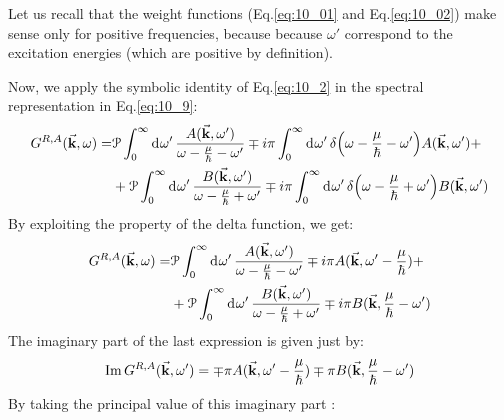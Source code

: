 \documentclass[../main/main.tex]{subfiles}
\begin{document}
\begin{remark}
Let us recall that the weight functions (Eq.\eqref{eq:10_01} and Eq.\eqref{eq:10_02}) make sense only for positive frequencies, because because \( \omega'  \) correspond to the excitation energies (which are positive by definition).
\end{remark}

Now, we apply the symbolic identity of Eq.\eqref{eq:10_2} in the spectral representation in Eq.\eqref{eq:10_9}:
\begin{equation*}
\begin{split}
G^{R,A} (\va{k}, \omega )  = &\mathcal{P} \int_{0}^{\infty } \dd[]{\omega'}
\frac{A(\va{k}, \omega')}{\omega - \frac{\mu }{\hbar } - \omega'}
\mp i \pi \int_{0}^{\infty } \dd[]{\omega'} \delta \qty( \omega - \frac{\mu }{\hbar } - \omega') A(\va{k}, \omega')   +   \\
& + \mathcal{P} \int_{0}^{\infty } \dd[]{\omega'}
\frac{B(\va{k}, \omega')}{\omega - \frac{\mu }{\hbar } + \omega'}
\mp i \pi \int_{0}^{\infty } \dd[]{\omega'} \delta \qty( \omega - \frac{\mu }{\hbar } + \omega') B(\va{k}, \omega')
\end{split}
\end{equation*}
By exploiting the property of the delta function, we get:
\begin{equation*}
\begin{split}
G^{R,A} (\va{k}, \omega )  = &\mathcal{P} \int_{0}^{\infty } \dd[]{\omega'}
\frac{A(\va{k}, \omega')}{\omega - \frac{\mu }{\hbar } - \omega'}
\mp i \pi A(\va{k}, \omega' - \frac{\mu }{\hbar })   +   \\
& + \mathcal{P} \int_{0}^{\infty } \dd[]{\omega'}
\frac{B(\va{k}, \omega')}{\omega - \frac{\mu }{\hbar } + \omega'}
\mp i \pi B(\va{k}, \frac{\mu }{\hbar } - \omega' )
\end{split}
\end{equation*}
The imaginary part of the last expression is given just by:
\begin{equation*}
  \Im G^{R,A} (\va{k}, \omega') = \mp \pi  A (\va{k}, \omega' - \frac{\mu }{\hbar }) \mp \pi B (\va{k}, \frac{\mu }{\hbar } - \omega' )
\end{equation*}
By taking the principal value of this imaginary part :
\end{document}
